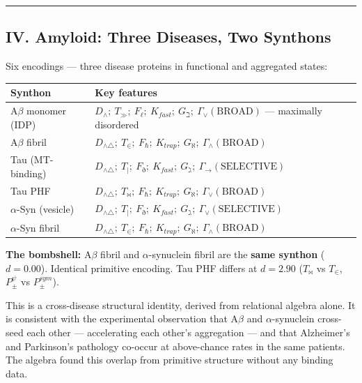 \documentclass[12pt,a4paper]{article}
\begin{document}
\begin{center}
\rule{0.5\textwidth}{0.4pt}
\end{center}

\subsection{IV. Amyloid: Three Diseases, Two Synthons}

Six encodings --- three disease proteins in functional and aggregated states:

\begin{table}[htbp]
\centering
\small
{}
\begin{tabularx}{\textwidth}{>{\centering\arraybackslash}X >{\centering\arraybackslash}X}
\toprule
\rowcolor{gray!25}\textbf{Synthon} & \textbf{Key features} \\
\midrule
\rowcolors{1}{white}{gray!10}
A$\beta$ monomer (IDP) & $D_\wedge;\ T_\gg;\ F_\ell;\ K_{fast};\ G_\beth;\ \Gamma_\vee(\text{BROAD})$ --- maximally disordered \\
A$\beta$ fibril & $D_{\wedge\triangle};\ T_\in;\ F_\hbar;\ K_{trap};\ G_\aleph;\ \Gamma_\wedge(\text{BROAD})$ \\
Tau (MT-binding) & $D_{\wedge\triangle};\ T_{\vert};\ F_\eth;\ K_{fast};\ G_\gimel;\ \Gamma_\to(\text{SELECTIVE})$ \\
Tau PHF & $D_{\wedge\triangle};\ T_\bowtie;\ F_\hbar;\ K_{trap};\ G_\aleph;\ \Gamma_\vee(\text{BROAD})$ \\
$\alpha$-Syn (vesicle) & $D_{\wedge\triangle};\ T_{\vert};\ F_\eth;\ K_{fast};\ G_\gimel;\ \Gamma_\vee(\text{SELECTIVE})$ \\
$\alpha$-Syn fibril & $D_{\wedge\triangle};\ T_\in;\ F_\hbar;\ K_{trap};\ G_\aleph;\ \Gamma_\wedge(\text{BROAD})$ \\
\bottomrule
\end{tabularx}
\end{table}

\textbf{The bombshell:} A$\beta$ fibril and $\alpha$-synuclein fibril are the \textbf{same synthon} ($d = 0.00$). Identical primitive encoding. Tau PHF differs at $d = 2.90$ ($T_\bowtie$ vs $T_\in$, $P_\pm^\psi$ vs $P_\pm^{sym}$).

This is a cross-disease structural identity, derived from relational algebra alone. It is consistent with the experimental observation that A$\beta$ and $\alpha$-synuclein cross-seed each other --- accelerating each other's aggregation --- and that Alzheimer's and Parkinson's pathology co-occur at above-chance rates in the same patients. The algebra found this overlap from primitive structure without any binding data.
\end{document}

